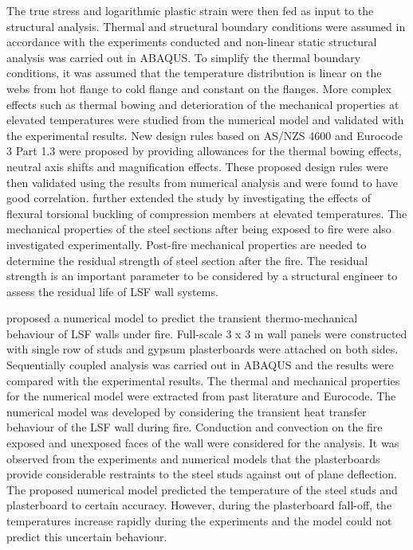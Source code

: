 The true stress and logarithmic plastic strain were then fed as input to the structural analysis. Thermal and structural boundary conditions were assumed in accordance with the experiments conducted and non-linear static structural analysis was carried out in ABAQUS. To simplify the thermal boundary conditions, it was assumed that the temperature distribution is linear on the webs from hot flange to cold flange and constant on the flanges. More complex effects such as thermal bowing and deterioration of the mechanical properties at elevated temperatures were studied from the numerical model and validated with the experimental results. New design rules based on AS/NZS 4600 and Eurocode 3 Part 1.3 were proposed by providing allowances for the thermal bowing effects, neutral axis shifts and magnification effects. These proposed design rules were then validated using the results from numerical analysis and were found to have good correlation. \citet{Gunalan2014a} further extended the study by investigating the effects of flexural torsional buckling of compression members at elevated temperatures. The mechanical properties of the steel sections after being exposed to fire were also investigated experimentally. Post-fire mechanical properties are needed to determine the residual strength of steel section after the fire. The residual strength is an important parameter to be considered by a structural engineer to assess the residual life of LSF wall systems. 

\citet{Nassif2014a} proposed a numerical model to predict the transient thermo-mechanical behaviour of LSF walls under fire. Full-scale 3 x 3 m wall panels were constructed with single row of studs and gypsum plasterboards were attached on both sides. Sequentially coupled analysis was carried out in ABAQUS and the results were compared with the experimental results. The thermal and mechanical properties for the numerical model were extracted from past literature and Eurocode. The numerical model was developed by considering the transient heat transfer behaviour of the LSF wall during fire. Conduction and convection on the fire exposed and unexposed faces of the wall were considered for the analysis. It was observed from the experiments and numerical models that the plasterboards provide considerable restraints to the steel studs against out of plane deflection. The proposed numerical model predicted the temperature of the steel studs and plasterboard to certain accuracy. However, during the plasterboard fall-off, the temperatures increase rapidly during the experiments and the model could not predict this uncertain behaviour. 

